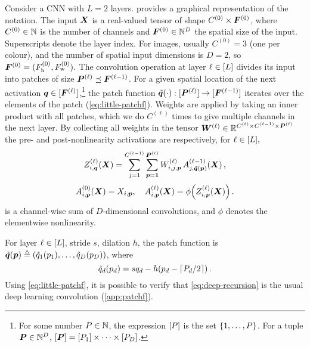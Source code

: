 \documentclass[accepted]{uai2021} %
\newcommand{\layerAs}[2]{Z^{(#1)}_{#2}(\vX)}
\newcommand{\layerC}[1]{C^{(#1)}}
\newcommand{\layerNLAs}[2]{A^{(#1)}_{#2}(\vX)}
\newcommand{\layerWs}[1]{W^{(#1)}}
\newcommand{\layerW}[1]{\mW^{(#1)}}
\newcommand{\layersizebase}{\vF}
\newcommand{\layersize}[1]{{\layersizebase^{\bra{#1}}}}
\newcommand{\layerw}[1]{F_\text{w}^{(#1)}}
\newcommand{\layerh}[1]{F_\text{h}^{(#1)}}
\newcommand{\patchsizebase}{\vP}
\newcommand{\patchsizebases}{P}
\newcommand{\patchsize}[1]{{\patchsizebase^{\bra{#1}}}}
\newcommand{\patchw}[1]{P_\text{w}^{(#1)}}
\newcommand{\patchh}[1]{P_\text{h}^{(#1)}}
\newcommand{\patchf}[2]{{\tilde#1\bra{#2}}}
\newcommand{\convpatch}[1]{{\text{im}\bra{\tilde#1}}}
\newcommand{\chan}{i}
\newcommand{\prevchan}{j}   %
\newcommand{\patch}{\vp}               %
\newcommand{\patchs}{p}               %
\newcommand{\nextpatch}{\vq}
\newcommand{\nextpatchs}{q}
\newcommand{\0}{\boldsymbol{0}}
\newcommand{\1}{\boldsymbol{1}}
\newcommand{\crefp}[1]{(\cref{#1})}
\begin{document}
Consider a CNN with $L=2$ layers.  provides a graphical representation of the notation.
The input ${\bm{X}}$ is a real-valued tensor of shape ${\layerC{0} \times \layersize{0}}$, where $\layerC{0} \in \sN$ is the number of channels and $\layersize{0} \in \sN^{D}$ the spatial size of the input.  Superscripts denote the layer index.
For images, usually $\layerC{0}=3$ (one per colour), and the number of spatial input dimensions is $D=2$, so $\layersize{0} = (\layerh{0}, \layerw{0}).$
The convolution operation at layer $\ell\in[L]$ divides its input into patches of size
$\patchsize{\ell} \preceq \layersize{\ell-1}$. For a given spatial location of the next activation
$\nextpatch\in\countto{\layersize{\ell}}$,\footnote{For some number
  $\patchsizebases\in \sN$, the expression $\countto{\patchsizebases}$ is the
  set $\cb{1,\dots,\patchsizebases}$. For a tuple $\patchsizebase\in\sN^{D}$,
  $\countto{\patchsizebase} = \countto{\patchsizebases_{1}}\times \dots \times \countto{\patchsizebases_{D}}$.}
 the patch function
$\patchf{\nextpatch}{\cdot}: \countto{\patchsize{\ell}} \to \countto{\layersize{\ell-1}}$
iterates over the elements of the patch \crefp{eq:little-patchf}. Weights are applied by taking an inner product with all patches, which we do $\layerC{\ell}$ times to give multiple channels in the next layer. By collecting all weights in the tensor $\layerW{\ell}\in\sR^{\layerC{\ell}\times \layerC{\ell-1}\times \patchsize{\ell}}$ the pre- and post-nonlinearity activations are respectively, for $\ell\in[L],$
\begin{equation}
    \layerAs{\ell}{\chan,\nextpatch} = \sum_{\prevchan=1}^{\layerC{\ell-1}} \sum_{\patch=\1}^{\patchsize{\ell}} \layerWs{\ell}_{\chan,\prevchan,\patch}\, \layerNLAs{\ell-1}{\prevchan,\patchf{\nextpatch}{\patch}}\,,
    \label{eq:deep-recursion}
\end{equation}
\begin{equation}
  \layerNLAs{0}{\chan,\patch} = X_{\chan,\patch},\quad \layerNLAs{\ell}{\chan,\patch} = \phi\bra{\layerAs{\ell}{\chan,\patch}}\,.
  \label{eq:deep-activations}
\end{equation}
 is a channel-wise sum of $D$-dimensional convolutions, and $\phi$ denotes the elementwise nonlinearity.

For layer $\ell\in[L]$, stride $s$, dilation $h$, the patch function is $\patchf{\nextpatch}{\patch} \eqdef \bra{\patchf{\nextpatchs_{1}}{\patchs_{1}}, \dots, \patchf{\nextpatchs_{D}}{\patchs_{D}}}$, where
\begin{equation}
  \patchf{\nextpatchs_{d}}{\patchs_{d}} = s\nextpatchs_{d} -  h\bra{\patchs_{d} - \ceil{\patchsizebases_{d}/2}}\,.
  \label{eq:little-patchf}
\end{equation}
Using \cref{eq:little-patchf}, it is possible to verify that \cref{eq:deep-recursion} is the usual deep learning convolution \crefp{app:patchf}.
\end{document}
